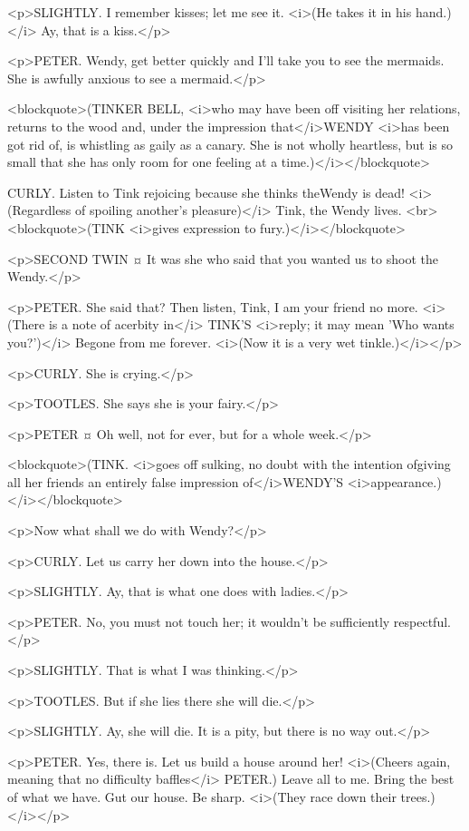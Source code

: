 <p>SLIGHTLY. I remember kisses; let me see it. <i>(He takes it in his hand.)</i> Ay, that is a kiss.</p>

<p>PETER. Wendy, get better quickly and I'll take you to see the mermaids. She is awfully anxious to see a mermaid.</p>

<blockquote>(TINKER BELL, <i>who may have been off visiting her relations, returns to the wood and, under the impression that</i>WENDY <i>has been got rid of, is whistling as gaily as a canary. She is not wholly heartless, but is so small that she has only room for one feeling at a time.)</i></blockquote>

CURLY. Listen to Tink rejoicing because she thinks theWendy is dead! <i>(Regardless of spoiling another's pleasure)</i> Tink, the Wendy lives. <br> <blockquote>(TINK <i>gives expression to fury.)</i></blockquote>

<p>SECOND TWIN ¤
It was she who said that you wanted us to shoot the Wendy.</p>

<p>PETER. She said that? Then listen, Tink, I am your friend no more. <i>(There is a note of acerbity in</i> TINK'S <i>reply; it may mean 'Who wants you?')</i> Begone from me forever. <i>(Now it is a very wet tinkle.)</i></p>

<p>CURLY. She is crying.</p>

<p>TOOTLES. She says she is your fairy.</p>

<p>PETER ¤
Oh well, not for ever, but for a whole week.</p>

<blockquote>(TINK. <i>goes off sulking, no doubt with the intention ofgiving all her friends an entirely false impression of</i>WENDY'S <i>appearance.)</i></blockquote>

<p>Now what shall we do with Wendy?</p>

<p>CURLY. Let us carry her down into the house.</p>

<p>SLIGHTLY. Ay, that is what one does with ladies.</p>

<p>PETER. No, you must not touch her; it wouldn't be sufficiently respectful.</p>

<p>SLIGHTLY. That is what I was thinking.</p>

<p>TOOTLES. But if she lies there she will die.</p>

<p>SLIGHTLY. Ay, she will die. It is a pity, but there is no way out.</p>

<p>PETER. Yes, there is. Let us build a house around her! <i>(Cheers again, meaning that no difficulty baffles</i> PETER.) Leave all to me. Bring the best of what we have. Gut our house. Be sharp. <i>(They race down their trees.)</i></p>

